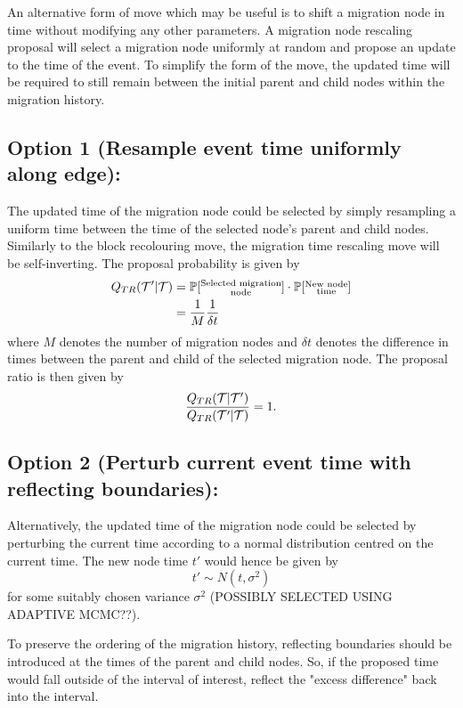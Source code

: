 An alternative form of move which may be useful is to shift a migration node in time without modifying any other parameters. A migration node rescaling proposal will select a migration node uniformly at random and propose an update to the time of the event. To simplify the form of the move, the updated time will be required to still remain between the initial parent and child nodes within the migration history.

\subsection{Option 1 (Resample event time uniformly along edge):}
	The updated time of the migration node could be selected by simply resampling a uniform time between the time of the selected node's parent and child nodes. Similarly to the block recolouring move, the migration time rescaling move will be self-inverting. The proposal probability is given by
		\begin{align*}
			Q_{TR} (\mathcal{T}' | \mathcal{T}) & = \mathbb{P}[\substack{\text{Selected migration} \\ \text{node}}] \cdot \mathbb{P} [\substack{\text{New node} \\ \text{time}}] \\
				& = \frac{1}{M} \frac{1}{\delta t}
		\end{align*}
	where $M$ denotes the number of migration nodes and $\delta t$ denotes the difference in times between the parent and child of the selected migration node. The proposal ratio is then given by
		\[
			\frac{Q_{TR} (\mathcal{T} | \mathcal{T}')}{Q_{TR} (\mathcal{T}' | \mathcal{T})} = 1.
		\]

\subsection{Option 2 (Perturb current event time with reflecting boundaries):}
	Alternatively, the updated time of the migration node could be selected by perturbing the current time according to a normal distribution centred on the current time. The new node time $t'$ would hence be given by
		\[
			t' \sim N(t, \sigma^2)
		\]
	for some suitably chosen variance $\sigma^2$ (POSSIBLY SELECTED USING ADAPTIVE MCMC??).
	
	To preserve the ordering of the migration history, reflecting boundaries should be introduced at the times of the parent and child nodes. So, if the proposed time would fall outside of the interval of interest, reflect the "excess difference" back into the interval.